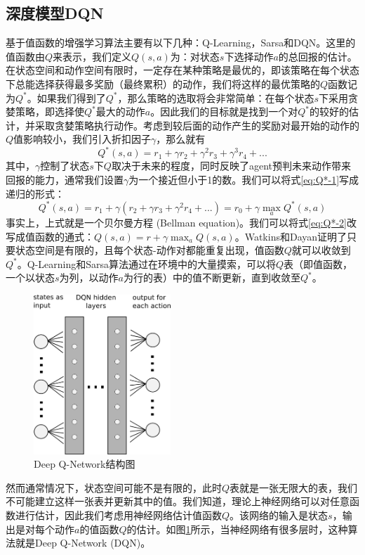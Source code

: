 \subsection{深度模型DQN}
基于值函数的增强学习算法主要有以下几种：Q-Learning，Sarsa和DQN。这里的值函数由$Q$来表示，我们定义$Q(s,a)$为：对状态$s$下选择动作$a$的总回报的估计。在状态空间和动作空间有限时，一定存在某种策略是最优的，即该策略在每个状态下总能选择获得最多奖励（最终累积）的动作，我们将这样的最优策略的$Q$函数记为$Q^*$。如果我们得到了$Q^*$，那么策略的选取将会非常简单：在每个状态$s$下采用贪婪策略，即选择使$Q^*$最大的动作$a$。因此我们的目标就是找到一个对$Q^*$的较好的估计，并采取贪婪策略执行动作。考虑到较后面的动作产生的奖励对最开始的动作的$Q$值影响较小，我们引入折扣因子$\gamma$，那么就有
\begin{equation}
    Q^*(s,a) = r_1 + \gamma r_2 + \gamma^2 r_3 + \gamma^3 r_4 + ...
\label{eq:Q*-1}
\end{equation}
其中，$\gamma$控制了状态$s$下$Q$取决于未来的程度，同时反映了agent预判未来动作带来回报的能力，通常我们设置$\gamma$为一个接近但小于1的数。我们可以将式\ref{eq:Q*-1}写成递归的形式：
\begin{equation}
    Q^*(s,a) = r_1 + \gamma(r_2 + \gamma r_3 + \gamma^2 r_4 + ...) = r_0 + \gamma \max_a Q^*(s,a)
    \label{eq:Q*-2}
\end{equation}
事实上，上式就是一个贝尔曼方程 (Bellman equation)。我们可以将式\ref{eq:Q*-2}改写成值函数的通式：$Q(s,a) = r + \gamma \max_a Q(s,a)$。Watkins和Dayan证明了\cite{watkins1988q}只要状态空间是有限的，且每个状态-动作对都能重复出现，值函数$Q$就可以收敛到$Q^*$。Q-Learning和Sarsa算法通过在环境中的大量摸索，可以将$Q$表（即值函数，一个以状态$s$为列，以动作$a$为行的表）中的值不断更新，直到收敛至$Q^*$。
\begin{figure}[ht]
    \centering
    \includegraphics[height=6cm]{figure/dqn.png}
    \caption{Deep Q-Network结构图}
    \label{fig:dqn}
\end{figure}
然而通常情况下，状态空间可能不是有限的，此时$Q$表就是一张无限大的表，我们不可能建立这样一张表并更新其中的值。我们知道，理论上神经网络可以对任意函数进行估计，因此我们考虑用神经网络估计值函数$Q$。该网络的输入是状态$s$，输出是对每个动作$a$的值函数$Q$的估计。如图\ref{fig:dqn}所示，当神经网络有很多层时，这种算法就是Deep Q-Network (DQN)。

